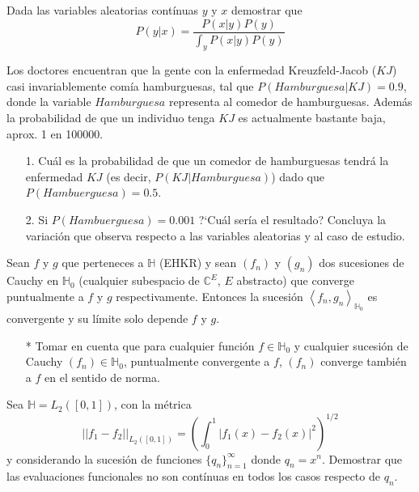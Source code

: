 \documentclass[12pt]{exam}
\begin{document}
\begin{questions}

\question[2] Dada las variables aleatorias cont\'inuas $y$ y $x$ demostrar que
\begin{equation*}
P(y|x)=\frac{P(x|y)P(y)}{\int_{y}P(x|y)P(y)}
\end{equation*}
\addpoints

\question[4] Los doctores encuentran que la gente con la enfermedad Kreuzfeld-Jacob ($KJ$) casi invariablemente com\'ia hamburguesas, tal que $P(Hamburguesa|KJ)=0.9$, donde la variable $Hamburguesa$ representa al comedor de hamburguesas. Adem\'as la probabilidad de que un individuo tenga $KJ$ es actualmente bastante baja, aprox. 1 en 100000. 
\begin{itemize}
\item[1.] Cu\'al es la probabilidad de que un comedor de hamburguesas tendr\'a la enfermedad $KJ$ (es decir, $P(KJ|Hamburguesa)$) dado que $P(Hambuerguesa)=0.5$.
\item[2.] Si $P(Hambuerguesa)=0.001$ ?`Cu\'al ser\'ia el resultado? Concluya la variaci\'on que observa respecto a las variables aleatorias y al caso de estudio.
\end{itemize}
\addpoints

\question[4] Sean $f$ y $g$ que perteneces a $\mathbb{H}$ (EHKR) y sean $(f_n)$ y $(g_n)$ dos sucesiones de Cauchy en $\mathbb{H}_0$ (cualquier subespacio de $\mathbb{C}^{E}$, $E$ abstracto) que converge puntualmente a $f$ y $g$ respectivamente. Entonces la sucesi\'on $\left<f_n,g_n\right>_{\mathbb{H}_0}$ es convergente y su l\'imite solo depende $f$ y $g$.
\begin{itemize}
	\item[*] Tomar en cuenta que para cualquier funci\'on $f\in\mathbb{H}_0$ y cualquier sucesi\'on de Cauchy $(f_n)\in\mathbb{H}_0$, puntualmente convergente a $f$, $(f_n)$ converge tambi\'en a $f$ en el sentido de norma.
\end{itemize}
\addpoints

\question[4]  Sea $\mathbb{H}=L_2([0,1])$, con la m\'etrica
\begin{equation*}
	||f_1-f_2||_{L_2([0,1])}=\left(\int_{0}^{1}|f_1(x)-f_2(x)|^2\right)^{1/2}
\end{equation*}
y considerando la sucesi\'on de funciones $\{q_n\}^{\infty}_{n=1}$ donde $q_n=x^n$. Demostrar que las evaluaciones funcionales no son cont\'inuas en todos los casos respecto de $q_n$.

\addpoints


\end{questions}
\end{document}
